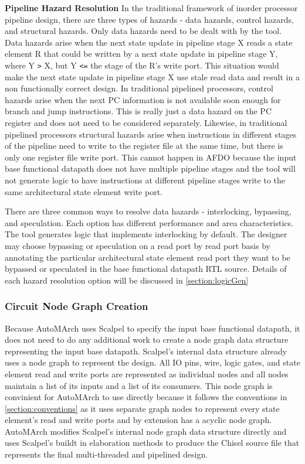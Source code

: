 {\bf Pipeline Hazard Resolution}
In the traditional framework of inorder processor pipeline design, there are three types of hazards - data hazards, control hazards, and structural hazards. Only data hazards need to be dealt with by the tool. Data hazards arise when the next state update in pipeline stage X reads a state element R that could be written by a next state update in pipeline stage Y, where Y {\tt >} X, but Y {\tt <=} the stage of the R's write port. This situation would make the next state update in pipeline stage X use stale read data and result in a non functionally correct design. In traditional pipelined processors, control hazards arise when the next PC information is not available soon enough for branch and jump instructions. This is really just a data hazard on the PC register and does not need to be considered separately. Likewise, in traditional pipelined processors structural hazards arise when instructions in different stages of the pipeline need to write to the register file at the same time, but there is only one register file write port. This cannot happen in AFDO because the input base functional datapath does not have multiple pipeline stages and the tool will not generate logic to have instructions at different pipeline stages write to the same architectural state element write port.

There are three common ways to resolve data hazards - interlocking, bypassing, and speculation. Each option has different performance and area characteristics. The tool generates logic that implements interlocking by default. The designer may choose bypassing or speculation on a read port by read port basis by annotating the particular architectural state element read port they want to be bypassed or speculated in the base functional datapath RTL source. Details of each hazard resolution option will be discussed in \ref{section:logicGen}

\subsubsection{Circuit Node Graph Creation}
\label{section:graphCreation}
Because AutoMArch uses Scalpel to specify the input base functional datapath, it does not need to do any additional work to create a node graph data structure representing the input base datapath. Scalpel's internal data structure already uses a node graph to represent the design. All IO pins, wire, logic gates, and state element read and write ports are represented as individual nodes and all nodes maintain a list of its inputs and a list of its consumers. This node graph is convinient for AutoMArch to use directly because it follows the conventions in \ref{section:conventions} as it uses separate graph nodes to represent every state element's read and write ports and by extension has a acyclic node graph. AutoMArch modifies Scalpel's internal node graph data structure directly and uses Scalpel's buildt in elaboration methods to produce the Chisel source file that represents the final multi-threaded and pipelined design.

